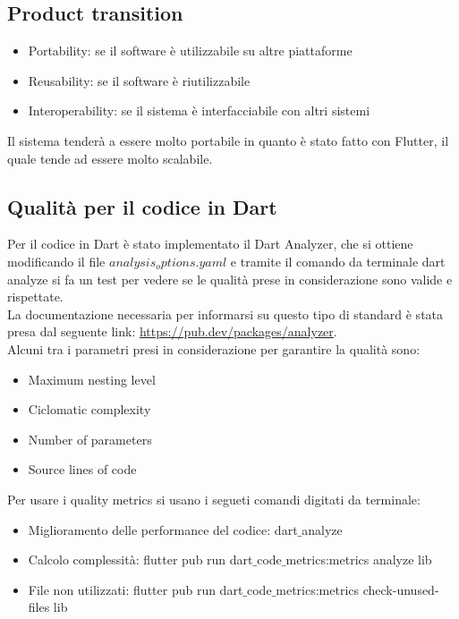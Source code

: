 \documentclass{article}
\begin{document}
\subsection{Product transition}
\begin{itemize}
    \item Portability: se il software è utilizzabile su altre piattaforme
    \item Reusability: se il software è riutilizzabile
    \item Interoperability: se il sistema è interfacciabile con altri sistemi
\end{itemize}
Il sistema tenderà a essere molto portabile in quanto è stato fatto con Flutter, il quale
tende ad essere molto scalabile.

\subsection{Qualità per il codice in Dart}
Per il codice in Dart è stato implementato il Dart Analyzer, che si ottiene modificando il file
$analysis_options.yaml$ e tramite il comando da terminale dart analyze si fa un test per 
vedere se le qualità prese in considerazione sono valide e rispettate.
\\La documentazione necessaria per informarsi su questo tipo di standard è stata presa
dal seguente link: \url{https://pub.dev/packages/analyzer}.
\\Alcuni tra i parametri presi in considerazione per garantire la qualità sono:

\begin{itemize}
    \item Maximum nesting level
    \item Ciclomatic complexity
    \item Number of parameters
    \item Source lines of code
\end{itemize}
Per usare i quality metrics si usano i segueti comandi digitati da terminale:
\begin{itemize}
    \item Miglioramento delle performance del codice: dart$\_$analyze
    \item Calcolo complessità: flutter pub run dart$\_$code$\_$metrics:metrics analyze lib
    \item File non utilizzati: flutter pub run dart$\_$code$\_$metrics:metrics check-unused-files lib
\end{itemize}
\end{document}
